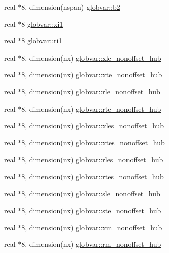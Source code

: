 \begin{DoxyCompactItemize}
\item 
real $\ast$8, dimension(nspan) \hyperlink{namespaceglobvar_a6c6b282f127b3722eee82e9d331f535e}{globvar\+::b2}
\item 
real $\ast$8 \hyperlink{namespaceglobvar_a1ccb279a7cd37dd73fbd7b0e07033e12}{globvar\+::xi1}
\item 
real $\ast$8 \hyperlink{namespaceglobvar_af44048ca90b116b55e4b210a748fb9fd}{globvar\+::ri1}
\item 
real $\ast$8, dimension(nx) \hyperlink{namespaceglobvar_a2b6fa2e27e00de6d45f740070d260fd0}{globvar\+::xle\+\_\+nonoffset\+\_\+hub}
\item 
real $\ast$8, dimension(nx) \hyperlink{namespaceglobvar_a931dc7aa3dcd2482c0788547aacdfd40}{globvar\+::xte\+\_\+nonoffset\+\_\+hub}
\item 
real $\ast$8, dimension(nx) \hyperlink{namespaceglobvar_aa7b9d1ee9e6007aabeaeeacdaa0f3544}{globvar\+::rle\+\_\+nonoffset\+\_\+hub}
\item 
real $\ast$8, dimension(nx) \hyperlink{namespaceglobvar_a43b488138b555f60d355edd22a416753}{globvar\+::rte\+\_\+nonoffset\+\_\+hub}
\item 
real $\ast$8, dimension(nx) \hyperlink{namespaceglobvar_a4774d9677c832856ce10a0773f0bafef}{globvar\+::xles\+\_\+nonoffset\+\_\+hub}
\item 
real $\ast$8, dimension(nx) \hyperlink{namespaceglobvar_aae34d48eb8f1d7c8720c099222880643}{globvar\+::xtes\+\_\+nonoffset\+\_\+hub}
\item 
real $\ast$8, dimension(nx) \hyperlink{namespaceglobvar_a3a4e993f098764c396ac8df346106120}{globvar\+::rles\+\_\+nonoffset\+\_\+hub}
\item 
real $\ast$8, dimension(nx) \hyperlink{namespaceglobvar_a4f08772533a642a2ae689a4e83b8e0e7}{globvar\+::rtes\+\_\+nonoffset\+\_\+hub}
\item 
real $\ast$8, dimension(nx) \hyperlink{namespaceglobvar_a01ec65d098c5cf6f7396ff80126eb25e}{globvar\+::sle\+\_\+nonoffset\+\_\+hub}
\item 
real $\ast$8, dimension(nx) \hyperlink{namespaceglobvar_a06fc43eda669fded7f4d926b2c06d517}{globvar\+::ste\+\_\+nonoffset\+\_\+hub}
\item 
real $\ast$8, dimension(nx) \hyperlink{namespaceglobvar_a43680257555ebbaba3cd4de3408e11cf}{globvar\+::xm\+\_\+nonoffset\+\_\+hub}
\item 
real $\ast$8, dimension(nx) \hyperlink{namespaceglobvar_a95b82ec95a1e3b3f2b9bbd53364a6fdc}{globvar\+::rm\+\_\+nonoffset\+\_\+hub}
\item 

\end{DoxyCompactItemize}
